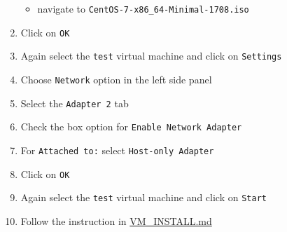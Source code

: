 \begin{enumerate}
  \begin{itemize}
  \tightlist
  \item
    navigate to \texttt{CentOS-7-x86\_64-Minimal-1708.iso}
  \end{itemize}
\item
  Click on \texttt{OK}
\item
  Again select the \texttt{test} virtual machine and click on
  \texttt{Settings}
\item
  Choose \texttt{Network} option in the left side panel
\item
  Select the \texttt{Adapter\ 2} tab
\item
  Check the box option for \texttt{Enable\ Network\ Adapter}
\item
  For \texttt{Attached\ to:} select \texttt{Host-only\ Adapter}
\item
  Click on \texttt{OK}
\item
  Again select the \texttt{test} virtual machine and click on
  \texttt{Start}
\item
  Follow the instruction in
  \href{https://github.com/europ/VUTBR-FIT-BT-IMPL/blob/master/VM_INSTALL.md}{VM\_INSTALL.md}
\end{enumerate}
